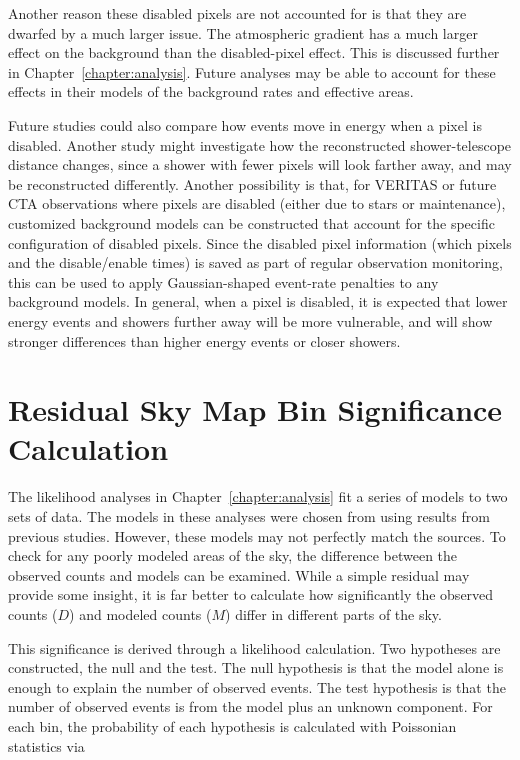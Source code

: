 Another reason these disabled pixels are not accounted for is that they are dwarfed by a much larger issue.
The atmospheric gradient has a much larger effect on the background than the disabled-pixel effect.
This is discussed further in Chapter~\ref{chapter:analysis}.
Future analyses may be able to account for these effects in their models of the background rates and effective areas.

Future studies could also compare how events move in energy when a pixel is disabled.
Another study might investigate how the reconstructed shower-telescope distance changes, since a shower with fewer pixels will look farther away, and may be reconstructed differently.
Another possibility is that, for VERITAS or future CTA observations where pixels are disabled (either due to stars or maintenance), customized background models can be constructed that account for the specific configuration of disabled pixels.
Since the disabled pixel information (which pixels and the disable/enable times) is saved as part of regular observation monitoring, this can be used to apply Gaussian-shaped event-rate penalties to any background models.
In general, when a pixel is disabled, it is expected that lower energy events and showers further away will be more vulnerable, and will show stronger differences than higher energy events or closer showers.



\chapter{Residual Sky Map Bin Significance Calculation}\label{app:sigdist}

The likelihood analyses in Chapter~\ref{chapter:analysis} fit a series of models to two sets of data.
The models in these analyses were chosen from using results from previous studies.
However, these models may not perfectly match the sources.
To check for any poorly modeled areas of the sky, the difference between the observed counts and models can be examined.
While a simple residual may provide some insight, it is far better to calculate how significantly the observed counts ($D$) and modeled counts ($M$) differ in different parts of the sky.

This significance is derived through a likelihood calculation.
Two hypotheses are constructed, the null and the test.
The null hypothesis is that the model alone is enough to explain the number of observed events.
The test hypothesis is that the number of observed events is from the model plus an unknown component.
For each bin, the probability of each hypothesis is calculated with Poissonian statistics via

